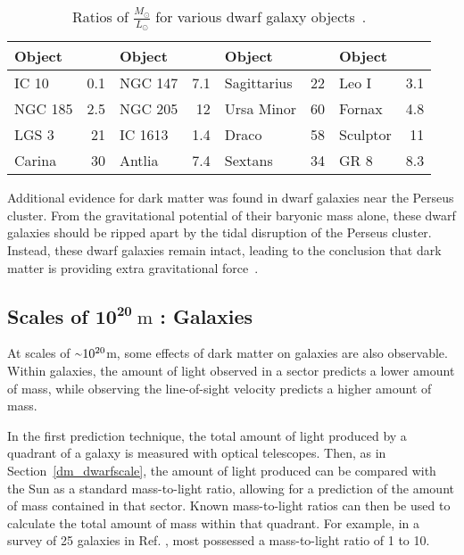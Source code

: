 \begin{table}[h]
  \centering
  \caption[Ratios of $\frac{\textrm{M}_\odot}{\textrm{L}_\odot}$ for Various Dwarf Galaxy Objects]{
    Ratios of $\frac{M_\odot}{L_\odot}$ for various dwarf galaxy objects~\cite{localdwarfs}.
  }
  \label{tab:mlratios:dwarfgals}
  \begin{tabular}{l r | l r | l r | l r}
    Object      &  \mlratio{} & Object & \mlratio{} & Object & \mlratio{} & Object & \mlratio{} \\
    \hline
    IC 10       &  0.1 & NGC 147    &  7.1 & Sagittarius & 22 & Leo I    &  3.1 \\
    NGC 185     &  2.5 & NGC 205    & 12   & Ursa Minor  & 60 & Fornax   &  4.8 \\
    LGS 3       & 21   & IC 1613    &  1.4 & Draco       & 58 & Sculptor & 11   \\
    Carina      & 30   & Antlia     &  7.4 & Sextans     & 34 & GR 8     &  8.3 \\
  \end{tabular}
\end{table}
    
Additional evidence for dark matter was found in dwarf galaxies near the Perseus cluster.
From the gravitational potential of their baryonic mass alone, these dwarf galaxies should be ripped apart by the tidal disruption of the Perseus cluster.
Instead, these dwarf galaxies remain intact, leading to the conclusion that dark matter is providing extra gravitational force~\cite{Penny2009}.

\FloatBarrier

\subsection[Scales of $10^{20}\:\text{m}$ : Galaxies]{Scales of $\mathbf{10^{20}}\:\text{m}$ : Galaxies}\label{dm_gal}
%
At scales of $\nicetilde 10^{20}$m, some effects of dark matter on galaxies are also observable.
Within galaxies, the amount of light observed in a sector predicts a lower amount of mass, while observing the line-of-sight velocity predicts a higher amount of mass.

In the first prediction technique, the total amount of light produced by a quadrant of a galaxy is measured with optical telescopes.
Then, as in Section~\ref{dm_dwarfscale}, the amount of light produced can be compared with the Sun as a standard mass-to-light ratio, allowing for a prediction of the amount of mass contained in that sector.
Known mass-to-light ratios can then be used to calculate the total amount of mass within that quadrant.
For example, in a survey of 25 galaxies in Ref. \cite{galaxy_mass_light_ratio}, most possessed a mass-to-light ratio of 1 to 10.


